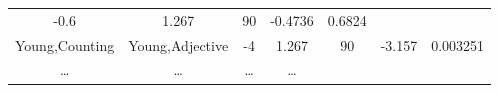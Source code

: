 \documentclass[]{article}
\theoremstyle{definition}
\theoremstyle{definition}
\theoremstyle{definition}
\theoremstyle{remark}
\begin{document}
\begin{longtable}[]{@{}ccccccc@{}}
\begin{minipage}[t]{0.10\columnwidth}
-0.6\strut
\end{minipage} & \begin{minipage}[t]{0.11\columnwidth}\centering\strut
1.267\strut
\end{minipage} & \begin{minipage}[t]{0.05\columnwidth}\centering\strut
90\strut
\end{minipage} & \begin{minipage}[t]{0.11\columnwidth}\centering\strut
-0.4736\strut
\end{minipage} & \begin{minipage}[t]{0.11\columnwidth}\centering\strut
0.6824\strut
\end{minipage}\tabularnewline
\begin{minipage}[t]{0.16\columnwidth}\centering\strut
Young,Counting\strut
\end{minipage} & \begin{minipage}[t]{0.16\columnwidth}\centering\strut
Young,Adjective\strut
\end{minipage} & \begin{minipage}[t]{0.10\columnwidth}\centering\strut
-4\strut
\end{minipage} & \begin{minipage}[t]{0.11\columnwidth}\centering\strut
1.267\strut
\end{minipage} & \begin{minipage}[t]{0.05\columnwidth}\centering\strut
90\strut
\end{minipage} & \begin{minipage}[t]{0.11\columnwidth}\centering\strut
-3.157\strut
\end{minipage} & \begin{minipage}[t]{0.11\columnwidth}\centering\strut
0.003251\strut
\end{minipage}\tabularnewline
\begin{minipage}[t]{0.16\columnwidth}\centering\strut
\ldots{}\strut
\end{minipage} & \begin{minipage}[t]{0.16\columnwidth}\centering\strut
\ldots{}\strut
\end{minipage} & \begin{minipage}[t]{0.10\columnwidth}\centering\strut
\ldots{}\strut
\end{minipage} & \begin{minipage}[t]{0.11\columnwidth}\centering\strut
\ldots{}\strut
\end{minipage} & \begin{minipage}[t]{0.05\columnwidth}\centering\strut

\end{minipage}
\end{longtable}
\end{document}
